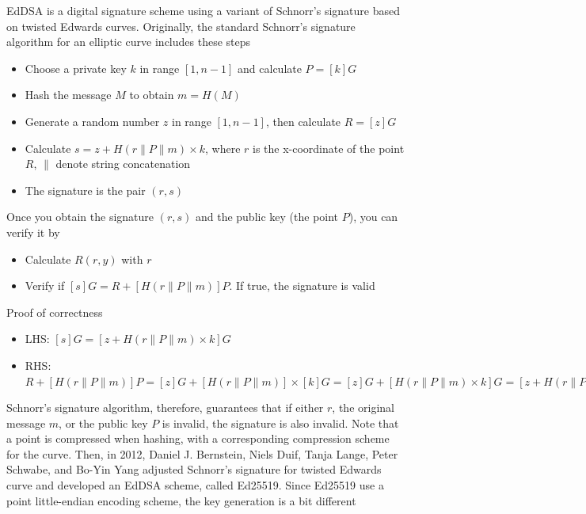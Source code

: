 EdDSA is a digital signature scheme using a variant of Schnorr’s signature based on twisted Edwards curves. Originally, the standard Schnorr’s signature algorithm for an elliptic curve includes these steps

\begin{itemize}
  \item Choose a private key $k$ in range $[1, n -1]$ and calculate $P = [k]G$
  \item Hash the message $M$ to obtain $m = H(M)$
  \item Generate a random number $z$ in range $[1, n -1]$, then calculate $R = [z]G$
  \item Calculate $s = z + H(r \| P \| m) \times k$, where $r$ is the x-coordinate of the point $R$, $\|$ denote string concatenation
  \item The signature is the pair $(r, s)$
\end{itemize}

Once you obtain the signature $(r, s)$ and the public key (the point $P$), you can verify it by

\begin{itemize}
  \item Calculate $R(r, y)$ with $r$
  \item Verify if $[s]G = R + [H(r \| P \| m)]P$. If true, the signature is valid
\end{itemize}

Proof of correctness

\begin{itemize}
  \item LHS: $[s]G = [z + H(r \| P \| m) \times k]G$
  \item RHS: $R + [H(r \| P \| m)] P = [z]G + [H(r \| P \| m)] \times [k]G = [z]G + [H(r \| P \| m) \times k]G = [z + H(r \| P \| m) \times k]G = LHS$
\end{itemize}

Schnorr’s signature algorithm, therefore, guarantees that if either $r$, the original message $m$, or the public key $P$ is invalid, the signature is also invalid. Note that a point is compressed when hashing, with a corresponding compression scheme for the curve. Then, in 2012, Daniel J. Bernstein, Niels Duif, Tanja Lange, Peter Schwabe, and Bo-Yin Yang adjusted Schnorr’s signature for twisted Edwards curve and developed an EdDSA scheme, called Ed25519. Since Ed25519 use a point little-endian encoding scheme, the key generation is a bit different

